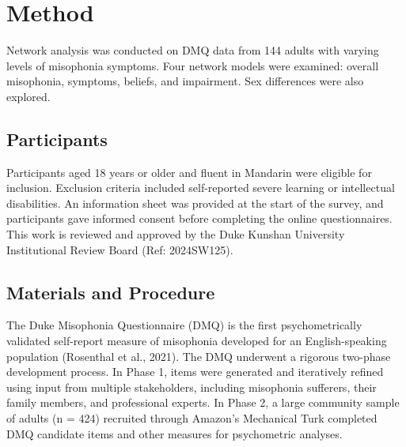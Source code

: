 \section{Method}
Network analysis was conducted on DMQ data from 144 adults with varying levels of misophonia symptoms. Four network models were examined: overall misophonia, symptoms, beliefs, and impairment. Sex differences were also explored.
\subsection{Participants}
Participants aged 18 years or older and fluent in Mandarin were eligible for inclusion. Exclusion criteria included self-reported severe learning or intellectual disabilities. An information sheet was provided at the start of the survey, and participants gave informed consent before completing the online questionnaires. This work is reviewed and approved by the Duke Kunshan University Institutional Review Board (Ref: 2024SW125). 
\subsection{Materials and Procedure}
The Duke Misophonia Questionnaire (DMQ) is the first psychometrically validated self-report measure of misophonia developed for an English-speaking population (Rosenthal et al., 2021). The DMQ underwent a rigorous two-phase development process. In Phase 1, items were generated and iteratively refined using input from multiple stakeholders, including misophonia sufferers, their family members, and professional experts. In Phase 2, a large community sample of adults (n = 424) recruited through Amazon’s Mechanical Turk completed DMQ candidate items and other measures for psychometric analyses. 